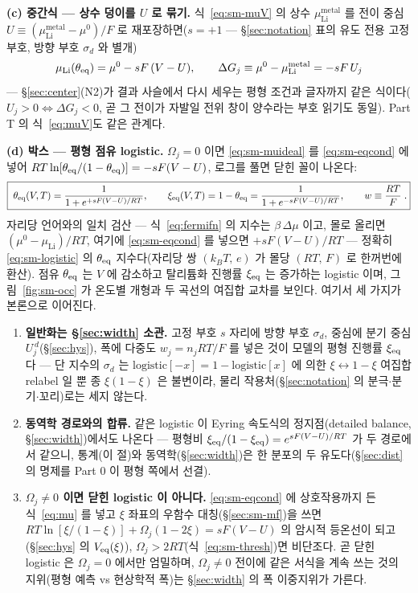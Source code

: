 \textbf{(c) 중간식 --- 상수 덩이를 $U$ 로 묶기.} 식~\eqref{eq:sm-muV} 의 상수 $\mu_\mathrm{Li}^\mathrm{metal}$
를 전이 중심 $U\equiv(\mu_\mathrm{Li}^\mathrm{metal}-\mu^0)/F$ 로 재포장하면($s=+1$ --- \S\ref{sec:notation}
표의 유도 전용 고정 부호, 방향 부호 $\sigma_d$ 와 별개)
\begin{equation}
\mu_\mathrm{Li}(\theta_{\mathrm{eq}})=\mu^0-sF\,(V-U),
\qquad
\Delta G_j\equiv\mu^0-\mu_\mathrm{Li}^\mathrm{metal}=-sF\,U_j
\label{eq:sm-eqcond}
\end{equation}
--- \S\ref{sec:center}(N2)가 결과 사슬에서 다시 세우는 평형 조건과 글자까지 같은 식이다($U_j>0
\Leftrightarrow\Delta G_j<0$, 곧 그 전이가 자발일 전위 창이 양수라는 부호 읽기도 동일). Part T 의
식~\eqref{eq:muV}도 같은 관계다.

\textbf{(d) 박스 --- 평형 점유 logistic.} $\Omega_j=0$ 이면 \eqref{eq:sm-muideal} 를 \eqref{eq:sm-eqcond} 에
넣어 $RT\ln[\theta_{\mathrm{eq}}/(1-\theta_{\mathrm{eq}})]=-sF(V-U)$, 로그를 풀면 닫힌 꼴이 나온다:
\begin{equation}
\boxed{\;\theta_{\mathrm{eq}}(V,T)=\frac{1}{1+e^{+sF(V-U)/RT}},\qquad
\xi_{\mathrm{eq}}(V,T)=1-\theta_{\mathrm{eq}}=\frac{1}{1+e^{-sF(V-U)/RT}},\qquad
w\equiv\frac{RT}{F}\;.}
\label{eq:sm-logistic}
\end{equation}
자리당 언어와의 일치 검산 --- 식~\eqref{eq:fermifn} 의 지수는 $\beta\,\Delta\mu$ 이고, 몰로 올리면
$(\mu^0-\mu_\mathrm{Li})/RT$, 여기에 \eqref{eq:sm-eqcond} 를 넣으면 $+sF(V-U)/RT$ --- 정확히
\eqref{eq:sm-logistic} 의 $\theta_{\mathrm{eq}}$ 지수다(자리당 쌍 $(k_BT,\,e)$ 가 몰당 $(RT,\,F)$ 로 한꺼번에 환산).
점유 $\theta_{\mathrm{eq}}$ 는 $V$ 에 감소하고 탈리튬화 진행률 $\xi_{\mathrm{eq}}$ 는 증가하는 logistic 이며,
그림~\ref{fig:sm-occ} 가 온도별 개형과 두 곡선의 여집합 교차를 보인다. 여기서 세 가지가 본론으로 이어진다.
\begin{enumerate}[label=(\roman*),leftmargin=2.2em,itemsep=1pt]
\item \textbf{일반화는 \S\ref{sec:width} 소관.} 고정 부호 $s$ 자리에 방향 부호 $\sigma_d$, 중심에 분기 중심
$U_j^{\,d}$(\S\ref{sec:hys}), 폭에 다중도 $w_j=n_jRT/F$ 를 넣은 것이 모델의 평형 진행률 $\xi_{\mathrm{eq}}$ 다 --- 단 지수의
$\sigma_d$ 는 $\mathrm{logistic}[-x]=1-\mathrm{logistic}[x]$ 에 의한 $\xi\leftrightarrow1-\xi$ 여집합
relabel 일 뿐 종 $\xi(1-\xi)$ 은 불변이라, 물리 작용처(\S\ref{sec:notation} 의 분극$\cdot$분기$\cdot$꼬리)로는
세지 않는다.
\item \textbf{동역학 경로와의 합류.} 같은 logistic 이 Eyring 속도식의 정지점(detailed balance,
\S\ref{sec:width})에서도 나온다 --- 평형비 $\xi_{\mathrm{eq}}/(1-\xi_{\mathrm{eq}})=e^{sF(V-U)/RT}$ 가 두 경로에서 같으니,
통계(이 절)와 동역학(\S\ref{sec:width})은 한 분포의 두 유도다(\S\ref{sec:dist} 의 명제를 Part 0 이 평형
쪽에서 선결).
\item \textbf{$\Omega_j\ne0$ 이면 닫힌 logistic 이 아니다.} \eqref{eq:sm-eqcond} 에 상호작용까지 든
식~\eqref{eq:mu} 를 넣고 $\xi$ 좌표의 우함수 대칭(\S\ref{sec:sm-mf})을 쓰면
$RT\ln[\xi/(1-\xi)]+\Omega_j(1-2\xi)=sF(V-U)$ 의 암시적 등온선이 되고(\S\ref{sec:hys} 의 $V_{\mathrm{eq}}(\xi)$),
$\Omega_j>2RT$(식~\eqref{eq:sm-thresh})면 비단조다. 곧 닫힌 logistic 은 $\Omega_j=0$ 에서만 엄밀하며,
$\Omega_j\ne0$ 전이에 같은 서식을 계속 쓰는 것의 지위(평형 예측 vs 현상학적 폭)는 \S\ref{sec:width} 의
폭 이중지위가 가른다.
\end{enumerate}

